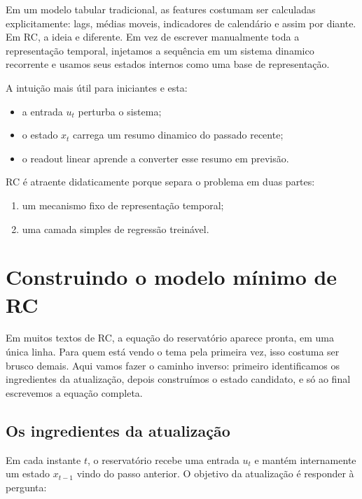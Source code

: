 \documentclass[12pt]{article}
\providecommand{\tightlist}{%
              \setlength{\itemsep}{0pt}\setlength{\parskip}{0pt}}
\begin{document}
Em um modelo tabular tradicional, as features costumam ser calculadas explicitamente: lags, médias moveis, indicadores de calendário e assim por diante. Em RC, a ideia e diferente. Em vez de escrever manualmente toda a representação temporal, injetamos a sequência em um sistema dinamico recorrente e usamos seus estados internos como uma base de representação.

A intuição mais útil para iniciantes e esta:

\begin{itemize}
\tightlist
\item
  a entrada \(u_t\) perturba o sistema;
\item
  o estado \(x_t\) carrega um resumo dinamico do passado recente;
\item
  o readout linear aprende a converter esse resumo em previsão.
\end{itemize}

RC é atraente didaticamente porque separa o problema em duas partes:

\begin{enumerate}
\def\labelenumi{\arabic{enumi}.}
\tightlist
\item
  um mecanismo fixo de representação temporal;
\item
  uma camada simples de regressão treinável.
\end{enumerate}

\section{Construindo o modelo mínimo de RC}\label{3-construindo-o-modelo-muxednimo-de-rc}

Em muitos textos de RC, a equação do reservatório aparece pronta, em uma única linha. Para quem está vendo o tema pela primeira vez, isso costuma ser brusco demais. Aqui vamos fazer o caminho inverso: primeiro identificamos os ingredientes da atualização, depois construímos o estado candidato, e só ao final escrevemos a equação completa.

\subsection{Os ingredientes da atualização}\label{31-os-ingredientes-da-atualizauxe7uxe3o}

Em cada instante \(t\), o reservatório recebe uma entrada \(u_t\) e mantém internamente um estado \(x_{t-1}\) vindo do passo anterior. O objetivo da atualização é responder à pergunta:
\end{document}
